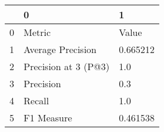 \begin{tabular}{lll}
\toprule
{} &                     0 &         1 \\
\midrule
0 &                Metric &     Value \\
1 &     Average Precision &  0.665212 \\
2 &  Precision at 3 (P@3) &       1.0 \\
3 &             Precision &       0.3 \\
4 &                Recall &       1.0 \\
5 &            F1 Measure &  0.461538 \\
\bottomrule
\end{tabular}

